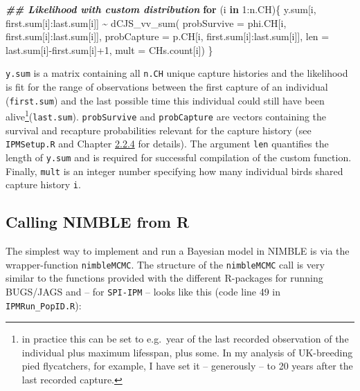 \documentclass[
]{book}
\newenvironment{Shaded}{\begin{snugshade}}{\end{snugshade}}
\newcommand{\AttributeTok}[1]{\textcolor[rgb]{0.77,0.63,0.00}{#1}}
\newcommand{\ControlFlowTok}[1]{\textcolor[rgb]{0.13,0.29,0.53}{\textbf{#1}}}
\newcommand{\DecValTok}[1]{\textcolor[rgb]{0.00,0.00,0.81}{#1}}
\newcommand{\DocumentationTok}[1]{\textcolor[rgb]{0.56,0.35,0.01}{\textbf{\textit{#1}}}}
\newcommand{\FunctionTok}[1]{\textcolor[rgb]{0.00,0.00,0.00}{#1}}
\newcommand{\NormalTok}[1]{#1}
\newcommand{\SpecialCharTok}[1]{\textcolor[rgb]{0.00,0.00,0.00}{#1}}
\begin{document}
\begin{Shaded}
\begin{Highlighting}[]
\DocumentationTok{\#\# Likelihood with custom distribution}
\ControlFlowTok{for}\NormalTok{ (i }\ControlFlowTok{in} \DecValTok{1}\SpecialCharTok{:}\NormalTok{n.CH)\{}
\NormalTok{  y.sum[i, first.sum[i]}\SpecialCharTok{:}\NormalTok{last.sum[i]] }\SpecialCharTok{\textasciitilde{}} \FunctionTok{dCJS\_vv\_sum}\NormalTok{(}
       \AttributeTok{probSurvive =}\NormalTok{ phi.CH[i, first.sum[i]}\SpecialCharTok{:}\NormalTok{last.sum[i]],}
       \AttributeTok{probCapture =}\NormalTok{ p.CH[i, first.sum[i]}\SpecialCharTok{:}\NormalTok{last.sum[i]],}
       \AttributeTok{len =}\NormalTok{ last.sum[i]}\SpecialCharTok{{-}}\NormalTok{first.sum[i]}\SpecialCharTok{+}\DecValTok{1}\NormalTok{,}
       \AttributeTok{mult =}\NormalTok{ CHs.count[i])}
\NormalTok{\}}
\end{Highlighting}
\end{Shaded}

\texttt{y.sum} is a matrix containing all \texttt{n.CH} unique capture histories and the
likelihood is fit for the range of observations between the first capture of an
individual (\texttt{first.sum}) and the last possible time this individual could still
have been alive\footnote{in practice this can be set to e.g.~year of the last recorded
  observation of the individual plus maximum lifesspan, plus some. In my analysis
  of UK-breeding pied flycatchers, for example, I have set it -- generously -- to
  20 years after the last recorded capture.}(\texttt{last.sum}). \texttt{probSurvive} and
\texttt{probCapture} are vectors containing the survival and recapture probabilities
relevant for the capture history (see \texttt{IPMSetup.R} and Chapter \protect\hyperlink{ux5cux23ux5cux23ux5cux2520Mark-recaptureux5cux2520dataux5cux2520likelihood}{2.2.4} for details). The argument \texttt{len} quantifies the length of \texttt{y.sum}
and is required for successful compilation of the custom function. Finally, \texttt{mult}
is an integer number specifying how many individual birds shared capture history
\texttt{i}.

\hypertarget{calling-nimble-from-r}{%
\subsection{Calling NIMBLE from R}\label{calling-nimble-from-r}}

The simplest way to implement and run a Bayesian model in NIMBLE is via the
wrapper-function \texttt{nimbleMCMC}. The structure of the \texttt{nimbleMCMC} call is very
similar to the functions provided with the different R-packages for running
BUGS/JAGS and -- for \texttt{SPI-IPM} -- looks like this (code line 49 in \texttt{IPMRun\_PopID.R}):
\end{document}
